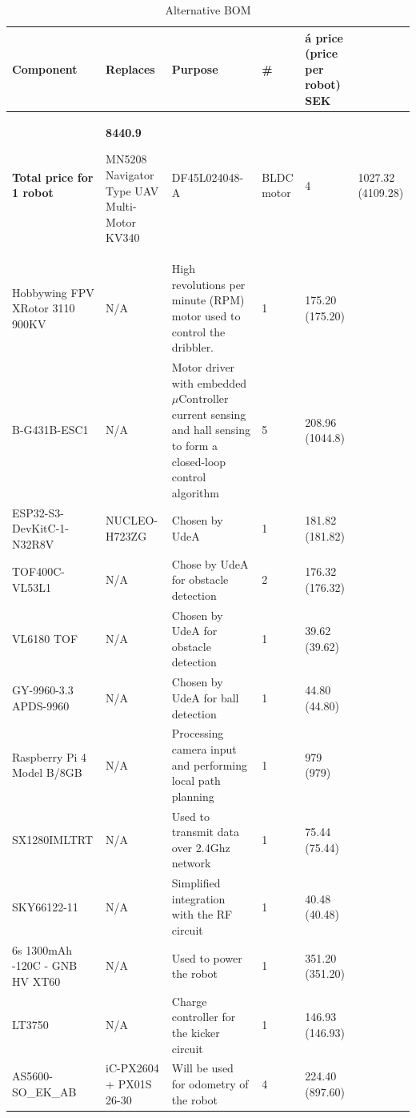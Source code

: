 \documentclass[a4paper,8pt]{article}
\begin{document}
  \begin{small}
    \begin{longtable}{|p{3cm}|p{3cm}|p{3cm}|p{1cm}|p{3cm}| }
      \caption{Alternative BOM} \\ \hline 
       \textbf{Component} & \textbf{Replaces} & \textbf{Purpose} & \textbf{\#} & \textbf{á price (price per robot) SEK}\\ \endhead \hline

       \textbf{Total price for 1 robot} & \textbf{8440.9} \endlastfoot \hline

      MN5208 Navigator Type UAV Multi-Motor KV340 & DF45L024048-A & BLDC motor & 4 & 1027.32 (4109.28)\\ \hline
      Hobbywing FPV XRotor 3110 900KV & N/A & High revolutions per minute (RPM) motor used to control the dribbler. & 1 & 175.20 (175.20) \\ \hline 
      B-G431B-ESC1 & N/A & Motor driver with embedded $\mu\text{Controller}$ current sensing and hall sensing to form a closed-loop control algorithm & 5 & 208.96 (1044.8)\\ \hline 
      ESP32-S3-DevKitC-1-N32R8V & NUCLEO-H723ZG & Chosen by UdeA & 1 & 181.82 (181.82) \\ \hline 
      TOF400C-VL53L1 & N/A & Chose by UdeA for obstacle detection & 2 & 176.32 (176.32) \\ \hline
      VL6180 TOF & N/A & Chosen by UdeA for obstacle detection & 1 & 39.62 (39.62) \\ \hline
      GY-9960-3.3 APDS-9960 & N/A & Chosen by UdeA for ball detection & 1 & 44.80 (44.80) \\ \hline
      Raspberry Pi 4 Model B/8GB & N/A & Processing camera input and performing local path planning & 1 & 979 (979) \\ \hline 
      SX1280IMLTRT & N/A & Used to transmit data over 2.4Ghz network & 1 & 75.44 (75.44) \\ \hline 
      SKY66122-11 & N/A & Simplified integration with the RF circuit & 1 & 40.48 (40.48) \\ \hline 
      6s 1300mAh -120C - GNB HV XT60 & N/A & Used to power the robot & 1 & 351.20 (351.20) \\ \hline 
      LT3750 & N/A & Charge controller for the kicker circuit & 1 & 146.93 (146.93)\\ \hline
      AS5600-SO\_EK\_AB & iC-PX2604 + PX01S 26-30 & Will be used for odometry of the robot & 4 & 224.40 (897.60) \\ \hline 

\end{longtable}
\end{small}
\end{document}
